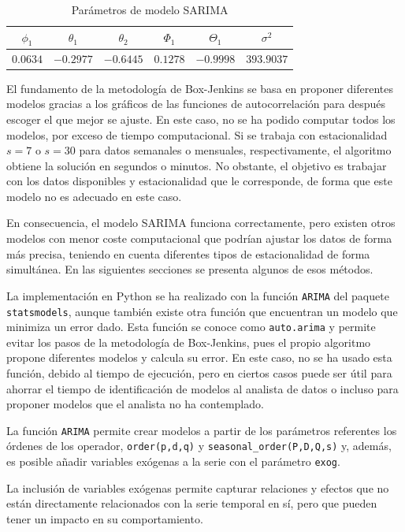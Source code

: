 \documentclass[12pt,twoside]{article}
\begin{document}
\begin{table}[h] 
\centering
\begin{tabular}{cccccc} \hline
    $\phi_1$ & $\theta_1$ & $\theta_2$ & $\Phi_1$ & $\Theta_1$ & $\sigma^2$  \\ \hline
    $0.0634$ & $-0.2977$  & $-0.6445$  & $0.1278$ & $-0.9998$  & $393.9037$ \\ \hline
\end{tabular}
\caption{Parámetros de modelo SARIMA} \label{tab:SARIMA2}
\end{table}


El fundamento de la metodología de Box-Jenkins se basa en proponer diferentes modelos gracias a los gráficos de las funciones de autocorrelación para después escoger el que mejor se ajuste. En este caso, no se ha podido computar todos los modelos, por exceso de tiempo computacional. Si se trabaja con estacionalidad $s=7$ o $s=30$ para datos semanales o mensuales, respectivamente, el algoritmo obtiene la solución en segundos o minutos. No obstante, el objetivo es trabajar con los datos disponibles y estacionalidad que le corresponde, de forma que este modelo no es adecuado en este caso.

En consecuencia, el modelo SARIMA funciona correctamente, pero existen otros modelos con menor coste computacional que podrían ajustar los datos de forma más precisa, teniendo en cuenta diferentes tipos de estacionalidad de forma simultánea. En las siguientes secciones se presenta algunos de esos métodos.

La implementación en Python se ha realizado con la función \texttt{ARIMA} del paquete \texttt{statsmodels}, aunque también existe otra función que encuentran un modelo que minimiza un error dado. Esta función se conoce como \texttt{auto.arima} y permite evitar los pasos de la metodología de Box-Jenkins, pues el propio algoritmo propone diferentes modelos y calcula su error. En este caso, no se ha usado esta función, debido al tiempo de ejecución, pero en ciertos casos puede ser útil para ahorrar el tiempo de identificación de modelos al analista de datos o incluso para proponer modelos que el analista no ha contemplado.

La función \texttt{ARIMA} permite crear modelos a partir de los parámetros referentes los órdenes de los operador, \texttt{order(p,d,q)} y \texttt{seasonal\_order(P,D,Q,s)} y, además, es posible añadir variables exógenas a la serie con el parámetro \texttt{exog}.

La inclusión de variables exógenas permite capturar relaciones y efectos que no están directamente relacionados con la serie temporal en sí, pero que pueden tener un impacto en su comportamiento. 
\end{document}
